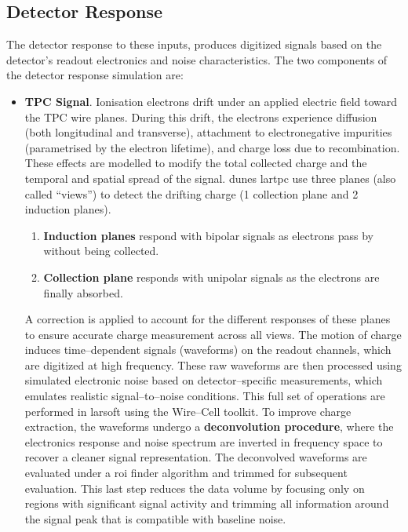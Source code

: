\subsection{Detector Response}\label{sec:RECONSTRUCTION}
The detector response to these inputs, produces digitized signals based on the detector's readout electronics and noise characteristics. The two components of the detector response simulation are:

\begin{itemize}
    \item{\textbf{TPC Signal}}.
    Ionisation electrons drift under an applied electric field toward the TPC wire planes. During this drift, the electrons experience diffusion (both longitudinal and transverse), attachment to electronegative impurities (parametrised by the electron lifetime), and charge loss due to recombination. These effects are modelled to modify the total collected charge and the temporal and spatial spread of the signal. \gls{dune}s \gls{lartpc} use three planes (also called ``views'') to detect the drifting charge (1 collection plane and 2 induction planes).

    \begin{enumerate}
        \item\textbf{Induction planes} respond with bipolar signals as electrons pass by without being collected.
        \item\textbf{Collection plane} responds with unipolar signals as the electrons are finally absorbed.
    \end{enumerate}

    A correction is applied to account for the different responses of these planes to ensure accurate charge measurement across all views. The motion of charge induces time--dependent signals (waveforms) on the readout channels, which are digitized at high frequency. These raw waveforms are then processed using simulated electronic noise based on detector--specific measurements, which emulates realistic signal--to--noise conditions. This full set of operations are performed in \gls{larsoft} using the Wire--Cell toolkit. To improve charge extraction, the waveforms undergo a \textbf{deconvolution procedure}, where the electronics response and noise spectrum are inverted in frequency space to recover a cleaner signal representation. The deconvolved waveforms are evaluated under a \gls{roi} finder algorithm and trimmed for subsequent evaluation. This last step reduces the data volume by focusing only on regions with significant signal activity and trimming all information around the signal peak that is compatible with baseline noise.


\end{itemize}
